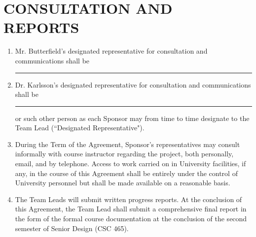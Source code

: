 \documentclass[11pt]{article}
\begin{document}
\section{CONSULTATION AND REPORTS}     
\begin{enumerate}  \itemsep4pt \parskip0pt 
\item  Mr. Butterfield's designated representative for consultation and communications shall be \\[3mm]  \rule{7cm}{0.4pt}     
\item Dr. Karlsson's designated representative for consultation and communications shall be \\[3mm]  \rule{7cm}{0.4pt}    or such other person as each Sponsor may from time to time designate to the Team Lead (``Designated Representative").    

\item During the Term of the Agreement, Sponsor's representatives may consult informally with course instructor regarding the project, both personally, email, and by telephone. Access to work carried on in University facilities, if any, in the course of this Agreement shall be entirely under the control of University personnel but shall be made available on a reasonable basis.    

\item The Team Leads will submit written progress reports. At the conclusion of this Agreement, the Team Lead shall submit a comprehensive final report in the form of the formal course documentation at the conclusion of the second semester of Senior Design (CSC 465). 
\end{enumerate}
\end{document}
